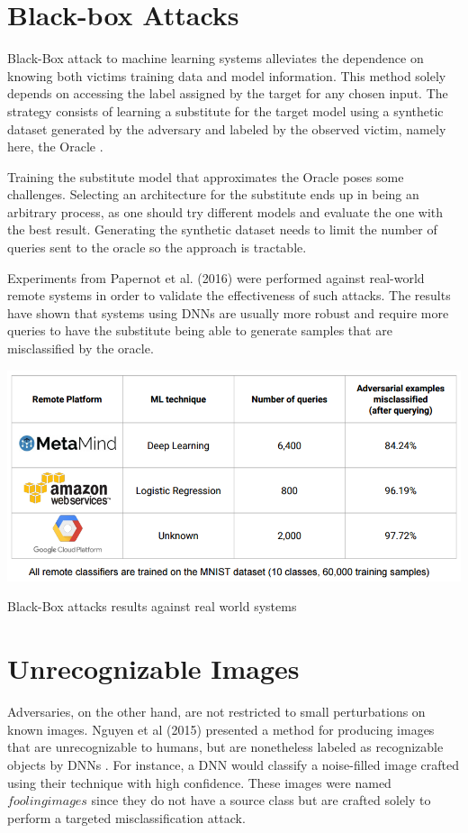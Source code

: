 \section{Black-box Attacks}
Black-Box attack to machine learning systems alleviates the dependence on knowing both victims training data and model information. This method solely depends on accessing the label assigned by the target for any chosen input. The strategy consists of learning a substitute for the target model using a synthetic dataset generated by the adversary and labeled by the observed victim, namely here, the Oracle \cite{papernot2016}.

Training the substitute model that approximates the Oracle poses some challenges. Selecting an architecture for the substitute ends up in being an arbitrary process, as one should try different models and evaluate the one with the best result. Generating the synthetic dataset needs to limit the number of queries sent to the oracle so the approach is tractable. 

Experiments from Papernot et al. (2016) were performed against real-world remote systems in order to validate the effectiveness of such attacks. The results have shown that systems using DNNs are usually more robust and require more queries to have the substitute being able to generate samples that are misclassified by the oracle.

\begin{table}[!h]
\centering
	\includegraphics[scale=0.7]{black_box.png}
\caption{Black-Box attacks results against real world systems}
\label{tbl:black_box}
\end{table}

\section{Unrecognizable Images}\label{subsec:unrec}

Adversaries, on the other hand, are not restricted to small perturbations on known images. Nguyen et al (2015) presented a method for producing images that are unrecognizable to humans, but are nonetheless labeled as recognizable objects by DNNs \cite{nguyen2015}. For instance, a DNN would classify a noise-filled image crafted using their technique with high confidence. These images were named $fooling images$ since they do not have a source class but are crafted solely to perform a targeted misclassification attack.

